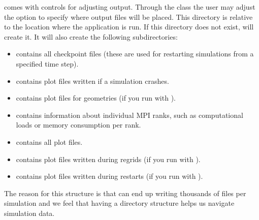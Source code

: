 \documentclass[letterpaper,10pt,english]{sphinxmanual}
\begin{document}
 comes with controls for adjusting output.
Through the {\hyperref[\detokenize{Source/Driver:chap-driver}]{}} class the user may adjust the option  to specify where output files will be placed.
This directory is relative to the location where the application is run.
If this directory does not exist,  will create it.
It will also create the following subdirectories:
\begin{itemize}
\item {} 
 contains all checkpoint files (these are used for restarting simulations from a specified time step).

\item {} 
 contains plot files written if a simulation crashes.

\item {} 
 contains plot files for geometries (if you run with ).

\item {} 
 contains information about individual MPI ranks, such as computational loads or memory consumption per rank.

\item {} 
 contains all plot files.

\item {} 
 contains plot files written during regrids (if you run with ).

\item {} 
 contains plot files written during restarts (if you run with ).

\end{itemize}

The reason for this structure is that  can end up writing thousands of files per simulation and we feel that having a directory structure helps us navigate simulation data.
\end{document}
